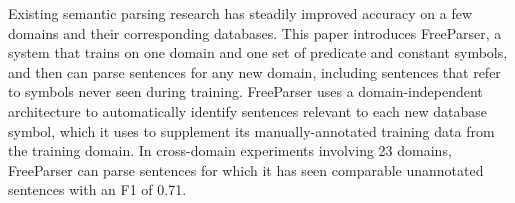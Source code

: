 Existing semantic parsing research has steadily improved accuracy on a few domains
 and their corresponding databases. This paper
 introduces FreeParser, a system that trains on
 one domain and one set of predicate and constant
 symbols, and then can parse sentences
 for any new domain, including sentences that
 refer to symbols never seen during training.
 FreeParser uses a domain-independent architecture
 to automatically identify sentences
 relevant to each new database symbol, which
 it uses to supplement its manually-annotated
 training data from the training domain. In
 cross-domain experiments involving 23
 domains, FreeParser can parse sentences for
 which it has seen comparable unannotated
 sentences with an F1 of 0.71.


